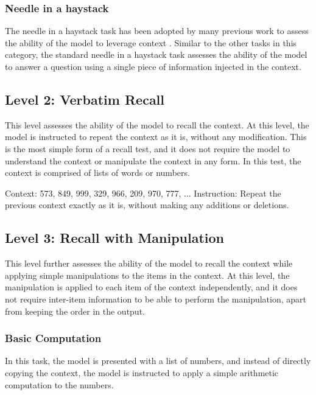 \subsubsection{Needle in a haystack}

The needle in a haystack task has been adopted by many previous work to assess the ability of the model to leverage context \cite{}. Similar to the other tasks in this category, the standard needle in a haystack task assesses the ability of the model to answer a question using a single piece of information injected in the context. 

\subsection{Level 2: Verbatim Recall}
This level assesses the ability of the model to recall the context. At this level, the model is instructed to  repeat the context as it is, without any modification. This is the most simple form of a recall test, and it does not require the model to understand the context or manipulate the context in any form. In this test, the context is comprised of lists of words or numbers.

\begin{tcolorbox}[colback=red!5!white,colframe=red!75!black,title=Example prompt]
Context: 573, 849, 999, 329, 966, 209, 970, 777, ...
\tcblower
Instruction: Repeat the previous context exactly as it is, without making any additions or deletions.
\end{tcolorbox}



\subsection{Level 3: Recall with Manipulation}
This level further assesses the ability of the model to recall the context while applying simple manipulations to the items in the context. At this level, the manipulation is applied to each item of the context independently, and it does not require inter-item information to be able to perform the manipulation, apart from keeping the order in the output.

\subsubsection{Basic Computation}
In this task, the model is presented with a list of numbers, and instead of directly copying the context, the model is instructed to apply a simple arithmetic computation to the numbers. 

